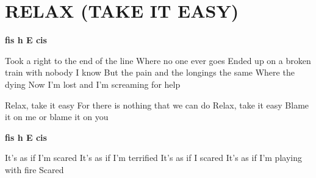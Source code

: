 \documentclass[../../../songbook.tex]{subfiles}
\begin{document}
\TabPositions{8cm} %
\section*{RELAX (TAKE IT EASY)}
{}
\vspace{0.5cm}
{\color{red}\textbf{fis h E cis} } \newline

Took a right to the end of the line					   \newline
Where no one ever goes								  \newline
Ended up on a broken train with nobody I know		 \newline
But the pain and the longings the same				  \newline
Where the dying										   \newline
Now I’m lost and I’m screaming for help				 \newline

\-\hspace{1cm} Relax, take it easy					      \newline    
\-\hspace{1cm} For there is nothing that we can do		   \newline
\-\hspace{1cm} Relax, take it easy						   \newline
\-\hspace{1cm} Blame it on me or blame it on you		   \newline

{\color{red}\textbf{fis h E cis} } \newline

It’s as if I’m scared		    \newline
It’s as if I’m terrified		    \newline
It’s as if I scared				    \newline
It’s as if I’m playing with fire		    \newline
Scared				    \newline
                         
\end{document}
